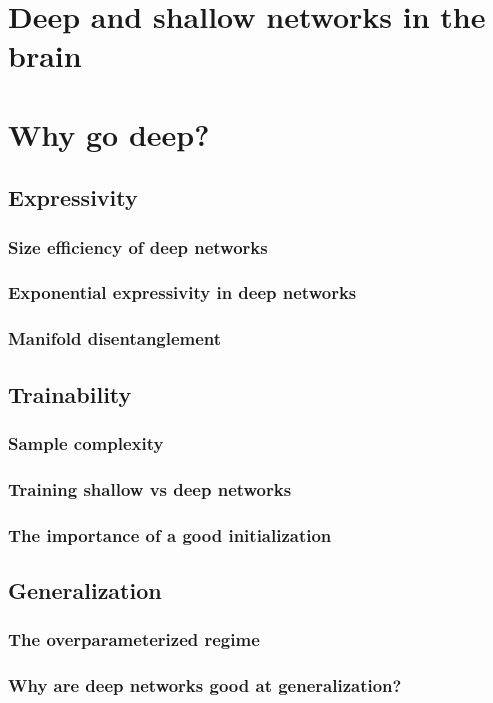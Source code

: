 \documentclass[11pt]{book} %
\begin{document}
\section{Deep and shallow networks in the brain}

\section{Why go deep?}
\subsection{Expressivity}
\subsubsection{Size efficiency of deep networks}
\subsubsection{Exponential expressivity in deep networks}
\subsubsection{Manifold disentanglement}
\subsection{Trainability}
\subsubsection{Sample complexity}
\subsubsection{Training shallow vs deep networks}
\subsubsection{The importance of a good initialization}
\subsection{Generalization}
\subsubsection{The overparameterized regime}
\subsubsection{Why are deep networks good at generalization?}
\end{document}
